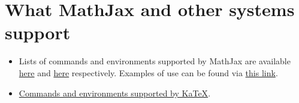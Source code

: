 \section{What MathJax and other systems support}
\begin{itemize}
\item Lists of commands and environments supported by MathJax are available \href{https://docs.mathjax.org/en/latest/tex.html#symbols}{here} and \href{http://docs.mathjax.org/en/latest/tex.html#environments}{here} respectively. Examples of use can be found via \href{http://meta.math.stackexchange.com/questions/5020/mathjax-basic-tutorial-and-quick-reference}{this link}.
\item \href{https://katex.org/docs/supported}{Commands and environments supported by KaTeX}.
\end{itemize}
